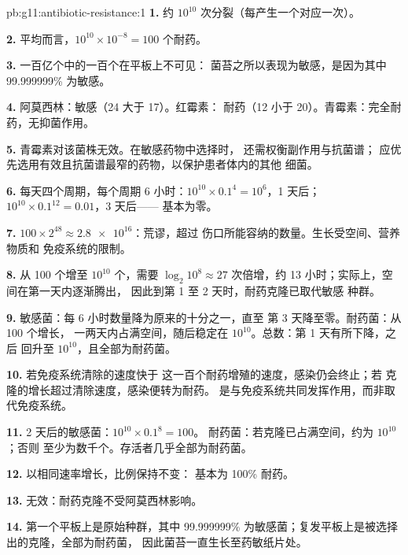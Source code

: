 \begin{solution}{pb:g11:antibiotic-resistance:1}
\textbf{1.} 约 $10^{10}$ 次分裂（每产生一个对应一次）。

\textbf{2.} 平均而言，$10^{10} \times 10^{-8} = 100$ 个耐药。

\textbf{3.} 一百亿个中的一百个在平板上不可见：
菌苔之所以表现为敏感，是因为其中 99.999999\% 为敏感。

\textbf{4.} 阿莫西林：敏感（24 大于 17）。红霉素：
耐药（12 小于 20）。青霉素：完全耐药，无抑菌作用。

\textbf{5.} 青霉素对该菌株无效。在敏感药物中选择时，
还需权衡副作用与抗菌谱；
应优先选用有效且抗菌谱最窄的药物，以保护患者体内的其他
细菌。

\textbf{6.} 每天四个周期，每个周期 6 小时：$10^{10} \times 0.1^4 =
10^6$，1 天后；$10^{10} \times 0.1^{12} = 0.01$，3 天后——
基本为零。

\textbf{7.} $100 \times 2^{48} \approx \num{2.8e16}$：荒谬，超过
伤口所能容纳的数量。生长受空间、营养物质和
免疫系统的限制。

\textbf{8.} 从 100 个增至 $10^{10}$ 个，需要 $\log_2 10^8 \approx 27$
次倍增，约 13 小时；实际上，空间在第一天内逐渐腾出，
因此到第 1 至 2 天时，耐药克隆已取代敏感
种群。

\textbf{9.} 敏感菌：每 6 小时数量降为原来的十分之一，直至
第 3 天降至零。耐药菌：从 100 个增长，
一两天内占满空间，随后稳定在 $10^{10}$。总数：第 1 天有所下降，之后
回升至 $10^{10}$，且全部为耐药菌。

\textbf{10.} 若免疫系统清除的速度快于
这一百个耐药增殖的速度，感染仍会终止；若
克隆的增长超过清除速度，感染便转为耐药。
是与免疫系统共同发挥作用，而非取代免疫系统。

\textbf{11.} 2 天后的敏感菌：$10^{10} \times 0.1^8 = 100$。
耐药菌：若克隆已占满空间，约为 $10^{10}$；否则
至少为数千个。存活者几乎全部为耐药菌。

\textbf{12.} 以相同速率增长，比例保持不变：
基本为 100\% 耐药。

\textbf{13.} 无效：耐药克隆不受阿莫西林影响。

\textbf{14.} 第一个平板上是原始种群，其中 99.999999\%
为敏感菌；复发平板上是被选择出的克隆，全部为耐药菌，
因此菌苔一直生长至药敏纸片处。


\end{solution}

